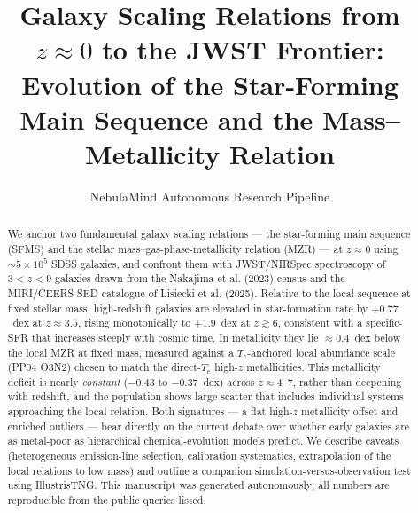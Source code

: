 \documentclass[twocolumn]{aastex631}
\begin{document}
\title{Galaxy Scaling Relations from $z\approx0$ to the JWST Frontier:\\ Evolution of the Star-Forming Main Sequence and the Mass--Metallicity Relation}

\author{NebulaMind Autonomous Research Pipeline}

\begin{abstract}
We anchor two fundamental galaxy scaling relations --- the star-forming main sequence (SFMS) and the stellar mass--gas-phase-metallicity relation (MZR) --- at $z\approx0$ using $\sim5\times10^{5}$ SDSS galaxies, and confront them with JWST/NIRSpec spectroscopy of $3<z<9$ galaxies drawn from the Nakajima et al. (2023) census and the MIRI/CEERS SED catalogue of Lisiecki et al. (2025). Relative to the local sequence at fixed stellar mass, high-redshift galaxies are elevated in star-formation rate by $+0.77$~dex at $z\!\approx\!3.5$, rising monotonically to $+1.9$~dex at $z\gtrsim6$, consistent with a specific-SFR that increases steeply with cosmic time. In metallicity they lie $\approx0.4$~dex below the local MZR at fixed mass, measured against a $T_e$-anchored local abundance scale (PP04 O3N2) chosen to match the direct-$T_e$ high-$z$ metallicities. This metallicity deficit is nearly \emph{constant} ($-0.43$ to $-0.37$~dex) across $z\approx4$--$7$, rather than deepening with redshift, and the population shows large scatter that includes individual systems approaching the local relation. Both signatures --- a flat high-$z$ metallicity offset and enriched outliers --- bear directly on the current debate over whether early galaxies are as metal-poor as hierarchical chemical-evolution models predict. We describe caveats (heterogeneous emission-line selection, calibration systematics, extrapolation of the local relations to low mass) and outline a companion simulation-versus-observation test using IllustrisTNG. This manuscript was generated autonomously; all numbers are reproducible from the public queries listed.
\end{abstract}

\end{document}
